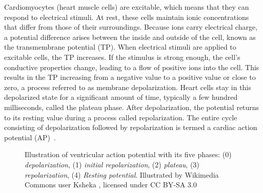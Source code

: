 Cardiomyocytes (heart muscle cells) are excitable, which means that they can respond to electrical stimuli. At rest, these cells maintain ionic concentrations that differ from those of their surroundings. Because ions carry electrical charge, a potential difference arises between the inside and outside of the cell, known as the transmembrane potential (TP).
When electrical stimuli are applied to excitable cells, the TP increases. If the stimulus is strong enough, the cell's conductive properties change, leading to a flow of positive ions into the cell. This results in the TP increasing from a negative value to a positive value or close to zero, a process referred to as membrane depolarization. Heart cells stay in this depolarized state for a significant amount of time, typically a few hundred milliseconds, called the plateau phase. After depolarization, the potential returns to its resting value during a process called repolarization. The entire cycle consisting of depolarization followed by repolarization is termed a cardiac action potential (AP)~\cite{2006Ctea}.
\begin{figure}[H]
    \centering
    
    \caption{Illustration of ventricular action potential with its five phases:  (0) \textit{depolarization}, (1) \textit{initial repolarization}, (2) \textit{plateau}, (3) \textit{repolarization}, (4) \textit{Resting potential}. Illustrated by Wikimedia Commons user Ksheka , licensed under CC BY-SA 3.0}
    \label{fig:AP}
\end{figure}



